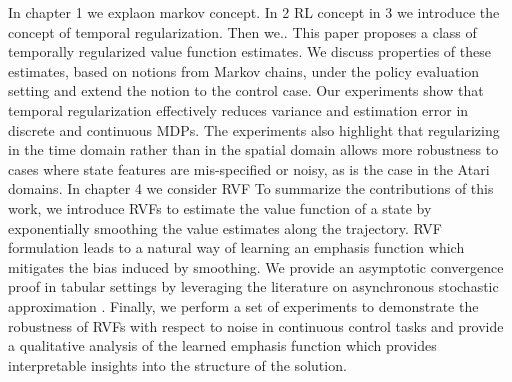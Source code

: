 In chapter 1 we explaon markov concept. In 2 RL concept in 3 we introduce the concept of temporal regularization. Then we..
This paper proposes a class of temporally regularized value function estimates. We discuss properties of these estimates, based on notions from Markov chains, under the policy evaluation setting and extend the notion to the control case. Our experiments show that temporal regularization effectively reduces variance and estimation error in discrete and continuous MDPs.  The experiments also highlight that regularizing in the time domain rather than in the spatial domain allows more robustness to cases where state features are mis-specified or noisy, as is the case in the Atari domains.
In chapter 4 we consider RVF
To summarize the contributions of this work, we introduce RVFs to estimate the value function of a state by exponentially smoothing the value estimates along the trajectory. RVF formulation leads to a natural way of learning an emphasis function which mitigates the bias induced by smoothing. We provide an asymptotic convergence proof in tabular settings by leveraging the literature on asynchronous stochastic approximation \cite{tsitsiklis1994asynchronous}. Finally, we perform a set of experiments to demonstrate the robustness of RVFs with respect to noise in continuous control tasks and provide a qualitative analysis of the learned emphasis function which provides interpretable insights into the structure of the solution.





